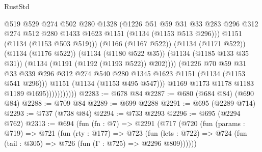 \begin{lexlean}{RustStd}
\begin{coremodule}
{\begin{coremodule}
{{{{{{{{{                                  @519
                                  @529
                                  @274
                                  @502
                                  @280
                                  @1328
                                  (@1226
                                    @51
                                    @59
                                    @31
                                    @33
                                    @283
                                    @296
                                    @312
                                    @274
                                    @512
                                    @280
                                    @1433
                                    @1623
                                    @1151
                                    (@1134 (@1153 @513 @296)))
                                  @1151
                                  (@1134 (@1153 @503 @519)))
                                (@1166 (@1167 @522))
                                (@1134 (@1171 @522))
                                (@1134 (@1176 @522))
                                (@1134 (@1180 @522 @35))
                                (@1134 (@1185 @133 @35 @31))
                                (@1134 (@1191 (@1192 (@1193 @522)) @202))))
                            (@1226
                              @70
                              @59
                              @31
                              @33
                              @339
                              @296
                              @312
                              @274
                              @540
                              @280
                              @1345
                              @1623
                              @1151
                              (@1134 (@1153 @541 @296)))
                            @1151
                            (@1134 (@1153 @495 @547)))
                          @1169
                          @1173
                          @1178
                          @1183
                          @1189
                          @1695)))))))))))
@2283 := @678 @84
@2287 := @680 (@684 @84) (@690 @84)
@2288 := @709 @84
@2289 := @699 @2288
@2291 := @695 (@2289 @714)
@2293 := @737 (@738 @84)
@2294 := @733 @2293
@2296 := @695 (@2294 @762)
@2313 := @694
    (fun (fn : @7) =>
    @2291
      (@717
        (@720
          (fun (params : @719) =>
          @721
            (fun (rty : @177) =>
            @723
              (fun (lets : @722) =>
              @724 (fun (tail : @305) => @726 (fun (Γ : @725) => @2296 @809))))))
}}}}}}}}}
\end{coremodule}}
\end{coremodule}
\end{lexlean}
